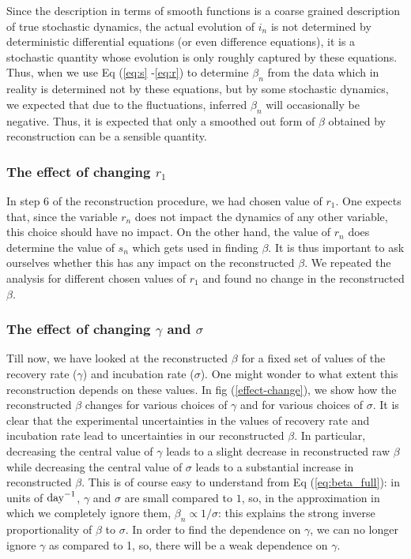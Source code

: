 \documentclass[aps,prd,10pt,twocolumn,nofootinbib]{revtex4-2}
\begin{document}
Since the description in terms of smooth functions is a coarse grained description of true stochastic dynamics, 
the actual evolution of $i_n$ is not determined by deterministic differential equations (or even difference equations), it is a stochastic quantity whose evolution is only roughly captured by these equations. Thus, when we use Eq (\ref{eq:s} -\ref{eq:r}) to determine $\beta_n$ from the data which in reality is determined not by these equations, but by some stochastic dynamics, we expected that due to the fluctuations, inferred $\beta_n$ will occasionally be negative.  
Thus, it is expected that only a smoothed out form of $\beta$ obtained by reconstruction can be a sensible quantity.

\subsubsection{The effect of changing $r_1$}

In step 6 of the reconstruction procedure, we had chosen value of $r_1$. One expects that, since the variable $r_n$ does not impact the dynamics of any other variable, this choice should have no impact. On the other hand, the value of $r_n$ does determine the value of $s_n$ which gets used in finding $\beta$. It is thus important to ask ourselves whether this has any impact on the reconstructed $\beta$. We repeated the analysis for different chosen values of $r_1$ and found no change in the reconstructed $\beta$. 

\subsubsection{The effect of changing $\gamma$ and $\sigma$}

Till now, we have looked at the reconstructed $\beta$ for a fixed set of values of the recovery rate ($\gamma$) and incubation rate ($\sigma$). One might wonder to what extent this reconstruction depends on these values. In fig (\ref{effect-change}), we show how the reconstructed $\beta$ changes for various choices of $\gamma$ and for various choices of $\sigma$. It is clear that the experimental uncertainties in the values of recovery rate and incubation rate lead to uncertainties in our reconstructed $\beta$. In particular,
decreasing the central value of $\gamma$ leads to a slight decrease in reconstructed raw $\beta$ while decreasing the central value of $\sigma$ leads to a substantial increase in reconstructed $\beta$. This is of course easy to understand from Eq (\ref{eq:beta_full}): 
in units of ${\rm day}^{-1}$, $\gamma$ and $\sigma$ are small compared to $1$, so, in the approximation in which we completely ignore them, $\beta_n \propto 1/\sigma$: this explains the strong inverse proportionality of $\beta$ to $\sigma$. In order to find the dependence on $\gamma$, we can no longer ignore $\gamma$ as compared to 1, so, there will be a weak dependence on $\gamma$.
\end{document}
